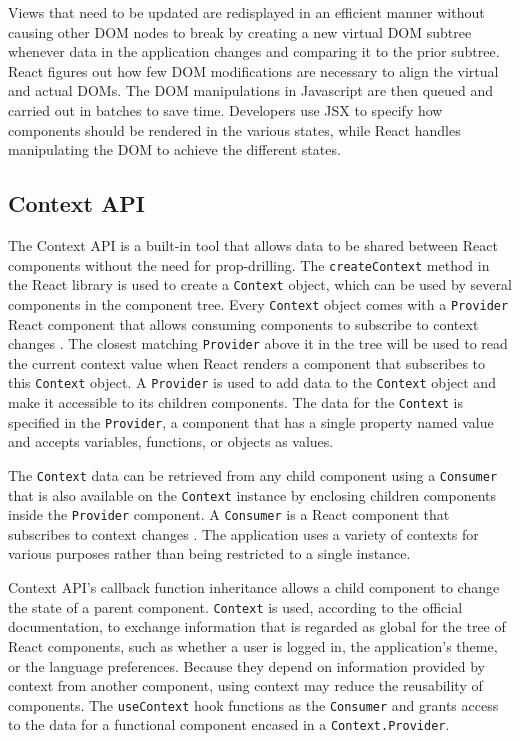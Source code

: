 Views that need to be updated are redisplayed in an efficient manner without causing other DOM nodes to break by creating a new virtual DOM subtree whenever data in the application changes and comparing it to the prior subtree. React figures out how few DOM modifications are necessary to align the virtual and actual DOMs. The DOM manipulations in Javascript are then queued and carried out in batches to save time. Developers use JSX to specify how components should be rendered in the various states, while React handles manipulating the DOM to achieve the different states.

\subsection{Context API}
\label{contextApi}
The Context API is a built-in tool that allows data to be shared between React components without the need for prop-drilling. The \texttt{createContext} method in the React library is used to create a \texttt{Context} object, which can be used by several components in the component tree. Every \texttt{Context} object comes with a \texttt{Provider} React component that allows consuming components to subscribe to context changes \autocite{react2021context}. The closest matching \texttt{Provider} above it in the tree will be used to read the current context value when React renders a component that subscribes to this \texttt{Context} object. A \texttt{Provider} is used to add data to the \texttt{Context} object and make it accessible to its children components. The data for the \texttt{Context} is specified in the \texttt{Provider}, a component that has a single property named value and accepts variables, functions, or objects as values.

The \texttt{Context} data can be retrieved from any child component using a \texttt{Consumer} that is also available on the \texttt{Context} instance by enclosing children components inside the \texttt{Provider} component. A \texttt{Consumer} is a React component that subscribes to context changes \autocite{react2021context}. The application uses a variety of contexts for various purposes rather than being restricted to a single instance.

Context API's callback function inheritance allows a child component to change the state of a parent component. \texttt{Context} is used, according to the official documentation, to exchange information that is regarded as global for the tree of React components, such as whether a user is logged in, the application's theme, or the language preferences. Because they depend on information provided by context from another component, using context may reduce the reusability of components. The \texttt{useContext} hook functions as the \texttt{Consumer} and grants access to the data for a functional component encased in a \texttt{Context.Provider}.

